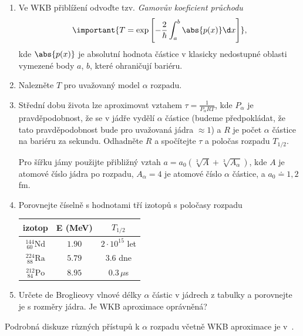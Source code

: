 	\begin{enumerate}
		\item 
			Ve WKB přiblížení odvoďte tzv. \emph{Gamovův koeficient průchodu}
			\begin{equation}
				\label{eq:Gammov}
				\important{
					T=\exp\left[-{\frac{2}{\hbar}}\int_{a}^{b}\abs{p(x)}\d x\right]
				},
			\end{equation}
			kde $\abs{p(x)}$ je absolutní hodnota  částice v klasicky nedostupné oblasti vymezené body $a$, $b$, které ohraničují bariéru.
		
		\item				
			Nalezněte $T$ pro uvažovaný model $\alpha$ rozpadu.
		
		\item
			Střední dobu života lze aproximovat vztahem $\tau=\frac{1}{P_{\alpha}RT}$, kde $P_{\alpha}$ je pravděpodobnost,
			že se v jádře vydělí $\alpha$ částice (budeme předpokládat, že tato pravděpodobnost bude
			pro uvažovaná jádra $\approx1$) a $R$ je počet  $\alpha$ částice na bariéru za sekundu.
			Odhadněte $R$ a spočítejte $\tau$ a poločas rozpadu $T_{1/2}$.
		
		Pro šířku jámy použijte přibližný vztah $a=a_{0}(\sqrt[3]{A}+\sqrt[3]{A_{\alpha}})$, kde $A$ je atomové číslo jádra po rozpadu, $A_\alpha=4$ je atomové číslo $\alpha$ částice, a $a_{0}\doteq1,\!2$ fm.
		
		\item
			Porovnejte číselně s hodnotami tří izotopů s poločasy rozpadu
			
			\begin{center}
				\begin{tabular}{|c|c|c|}
					\hline
					izotop & E (MeV) & $T_{1/2}$\\
					\hline
					\hline
					$^{144}_{\ 60}{\text{Nd}}$ & $1.90$ & $2\cdot10^{15}$ let\\
					\hline
					$^{224}_{\ 88}{\text{Ra}}$ & $5.79$ & $3.6$ dne\\
					\hline
					$^{212}_{\ 84}{\text{Po}}$ & $8.95$ & $0.3\,\mu$s\\
					\hline
				\end{tabular}
			\end{center}
		
		\item
			Určete de Broglieovy vlnové délky $\alpha$ částic v jádrech z tabulky a porovnejte je s rozměry jádra.
			Je WKB aproximace oprávněná?
		
	\end{enumerate}
\begin{note}
	Podrobná diskuze různých přístupů k $\alpha$ rozpadu včetně WKB aproximace je v~\cite{Holstein1996}.
\end{note}

